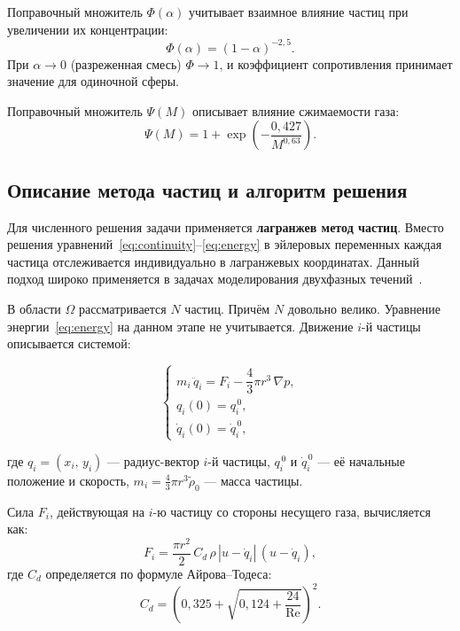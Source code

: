 \documentclass[14pt,a4paper]{extarticle}
\numberwithin{figure}{section}
\numberwithin{table}{section}
\begin{document}
Поправочный множитель $\Phi(\alpha)$ учитывает взаимное влияние частиц при
увеличении их концентрации:
\begin{equation}
    \Phi(\alpha) = (1 - \alpha)^{-2{,}5}.
\end{equation}
При $\alpha \to 0$ (разреженная смесь) $\Phi \to 1$, и коэффициент сопротивления
принимает значение для одиночной сферы.

Поправочный множитель $\Psi(M)$ описывает влияние сжимаемости газа:
\begin{equation}
    \Psi(M) = 1 + \exp\!\left(-\frac{0{,}427}{M^{0{,}63}}\right).
\end{equation}

\subsection{Описание метода частиц и алгоритм решения}

Для численного решения задачи применяется \textbf{лагранжев метод частиц}.
Вместо решения уравнений~\eqref{eq:continuity}--\eqref{eq:energy} в эйлеровых переменных
каждая частица отслеживается индивидуально в лагранжевых координатах.
Данный подход широко применяется в задачах моделирования двухфазных течений~\cite{CroweMultiphase}.

В области $\Omega$ рассматривается $N$ частиц. Причём $N$ довольно велико. Уравнение энергии~\eqref{eq:energy}
на данном этапе не учитывается. Движение $i$-й частицы описывается системой:

\begin{equation}
    \begin{cases}
        m_i\,\ddot{q}_i = F_i - \dfrac{4}{3}\pi r^3\,\nabla p, \\[8pt]
        q_i(0) = q_i^{\,0}, \\[4pt]
        \dot{q}_i(0) = \dot{q}_i^{\,0},
    \end{cases}
    \tag{$*$}
    \label{eq:particle}
\end{equation}

где $q_i = (x_i,\, y_i)$ --- радиус-вектор $i$-й частицы,
$q_i^{\,0}$ и $\dot{q}_i^{\,0}$ --- её начальные положение и скорость,
$m_i = \frac{4}{3}\pi r^3 \tilde{\rho}_0$ --- масса частицы.

Сила $F_i$, действующая на $i$-ю частицу со стороны несущего газа, вычисляется как:
\begin{equation}
    F_i = \frac{\pi r^2}{2}\,C_d\,\rho\,|u - \dot{q}_i|\,(u - \dot{q}_i),
    \label{eq:Fi}
\end{equation}
где $C_d$ определяется по формуле Айрова--Тодеса:
\begin{equation}
    C_d = \left(0{,}325 + \sqrt{0{,}124 + \frac{24}{\mathrm{Re}}}\right)^{\!2}.
    \label{eq:Cd_AT}
\end{equation}
\end{document}
